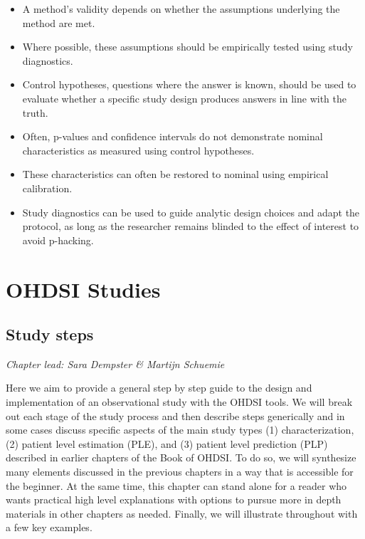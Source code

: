 \documentclass[11pt]{book}
\theoremstyle{definition}
\theoremstyle{definition}
\theoremstyle{definition}
\theoremstyle{remark}
\let\BeginKnitrBlock\begin \let\EndKnitrBlock\end
\begin{document}
\BeginKnitrBlock{rmdsummary}
\begin{itemize}
\item
  A method's validity depends on whether the assumptions underlying the method are met.
\item
  Where possible, these assumptions should be empirically tested using study diagnostics.
\item
  Control hypotheses, questions where the answer is known, should be used to evaluate whether a specific study design produces answers in line with the truth.
\item
  Often, p-values and confidence intervals do not demonstrate nominal characteristics as measured using control hypotheses.
\item
  These characteristics can often be restored to nominal using empirical calibration.
\item
  Study diagnostics can be used to guide analytic design choices and adapt the protocol, as long as the researcher remains blinded to the effect of interest to avoid p-hacking.
\end{itemize}
\EndKnitrBlock{rmdsummary}

\hypertarget{part-ohdsi-studies}{%
\part{OHDSI Studies}\label{part-ohdsi-studies}}

\hypertarget{StudySteps}{%
\chapter{Study steps}\label{StudySteps}}

\emph{Chapter lead: Sara Dempster \& Martijn Schuemie}

Here we aim to provide a general step by step guide to the design and implementation of an observational study with the OHDSI tools. We will break out each stage of the study process and then describe steps generically and in some cases discuss specific aspects of the main study types (1) characterization, (2) patient level estimation (PLE), and (3) patient level prediction (PLP) described in earlier chapters of the Book of OHDSI. To do so, we will synthesize many elements discussed in the previous chapters in a way that is accessible for the beginner. At the same time, this chapter can stand alone for a reader who wants practical high level explanations with options to pursue more in depth materials in other chapters as needed. Finally, we will illustrate throughout with a few key examples.
\end{document}

